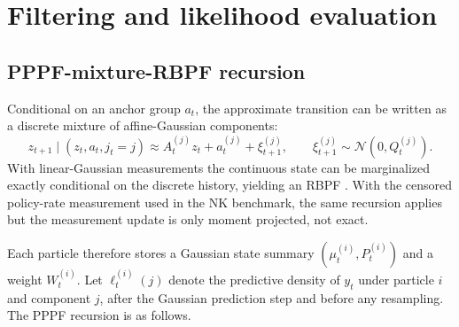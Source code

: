 \documentclass[11pt]{article}
\theoremstyle{remark}
\begin{document}
\section{Filtering and likelihood evaluation}
\label{sec:filtering}

\subsection{PPPF-mixture-RBPF recursion}

Conditional on an anchor group $a_t$, the approximate transition can be written as a discrete mixture of affine-Gaussian components:
\[
z_{t+1}\mid (z_t,a_t,j_t=j)
\approx
A_t^{(j)} z_t + a_t^{(j)} + \xi_{t+1}^{(j)},
\qquad
\xi_{t+1}^{(j)}\sim \mathcal{N}(0,Q_t^{(j)}).
\]
With linear-Gaussian measurements the continuous state can be marginalized exactly conditional on the discrete history, yielding an RBPF \citep{DoucetFreitasMurphyRussell2000}.
With the censored policy-rate measurement used in the NK benchmark, the same recursion applies but the measurement update is only moment projected, not exact.

Each particle therefore stores a Gaussian state summary $(\mu_t^{(i)},P_t^{(i)})$ and a weight $W_t^{(i)}$.
Let $\ell_t^{(i)}(j)$ denote the predictive density of $y_t$ under particle $i$ and component $j$, after the Gaussian prediction step and before any resampling.
The PPPF recursion is as follows.
\end{document}

